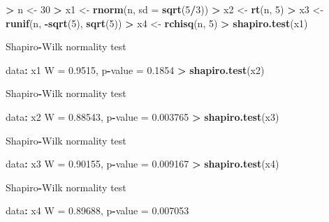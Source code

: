 \documentclass[
  a4paper,
  oneside]{scrbook}
\newenvironment{Shaded}{\begin{snugshade}}{\end{snugshade}}
\newcommand{\AttributeTok}[1]{\textcolor[rgb]{0.13,0.29,0.53}{#1}}
\newcommand{\DecValTok}[1]{\textcolor[rgb]{0.00,0.00,0.81}{#1}}
\newcommand{\FloatTok}[1]{\textcolor[rgb]{0.00,0.00,0.81}{#1}}
\newcommand{\FunctionTok}[1]{\textcolor[rgb]{0.13,0.29,0.53}{\textbf{#1}}}
\newcommand{\NormalTok}[1]{#1}
\newcommand{\OtherTok}[1]{\textcolor[rgb]{0.56,0.35,0.01}{#1}}
\newcommand{\SpecialCharTok}[1]{\textcolor[rgb]{0.81,0.36,0.00}{\textbf{#1}}}
\theoremstyle{definition}
\theoremstyle{definition}
\theoremstyle{definition}
\theoremstyle{definition}
\theoremstyle{remark}
\begin{document}
\footnotesize

\begin{Shaded}
\begin{Highlighting}[]
\SpecialCharTok{\textgreater{}}\NormalTok{ n }\OtherTok{\textless{}{-}} \DecValTok{30}
\SpecialCharTok{\textgreater{}}\NormalTok{ x1 }\OtherTok{\textless{}{-}} \FunctionTok{rnorm}\NormalTok{(n, }\AttributeTok{sd =} \FunctionTok{sqrt}\NormalTok{(}\DecValTok{5}\SpecialCharTok{/}\DecValTok{3}\NormalTok{))}
\SpecialCharTok{\textgreater{}}\NormalTok{ x2 }\OtherTok{\textless{}{-}} \FunctionTok{rt}\NormalTok{(n, }\DecValTok{5}\NormalTok{)}
\SpecialCharTok{\textgreater{}}\NormalTok{ x3 }\OtherTok{\textless{}{-}} \FunctionTok{runif}\NormalTok{(n, }\SpecialCharTok{{-}}\FunctionTok{sqrt}\NormalTok{(}\DecValTok{5}\NormalTok{), }\FunctionTok{sqrt}\NormalTok{(}\DecValTok{5}\NormalTok{))}
\SpecialCharTok{\textgreater{}}\NormalTok{ x4 }\OtherTok{\textless{}{-}} \FunctionTok{rchisq}\NormalTok{(n, }\DecValTok{5}\NormalTok{)}
\SpecialCharTok{\textgreater{}} \FunctionTok{shapiro.test}\NormalTok{(x1)}

\NormalTok{    Shapiro}\SpecialCharTok{{-}}\NormalTok{Wilk normality test}

\NormalTok{data}\SpecialCharTok{:}\NormalTok{  x1}
\NormalTok{W }\OtherTok{=} \FloatTok{0.9515}\NormalTok{, p}\SpecialCharTok{{-}}\NormalTok{value }\OtherTok{=} \FloatTok{0.1854}
\SpecialCharTok{\textgreater{}} \FunctionTok{shapiro.test}\NormalTok{(x2)}

\NormalTok{    Shapiro}\SpecialCharTok{{-}}\NormalTok{Wilk normality test}

\NormalTok{data}\SpecialCharTok{:}\NormalTok{  x2}
\NormalTok{W }\OtherTok{=} \FloatTok{0.88543}\NormalTok{, p}\SpecialCharTok{{-}}\NormalTok{value }\OtherTok{=} \FloatTok{0.003765}
\SpecialCharTok{\textgreater{}} \FunctionTok{shapiro.test}\NormalTok{(x3)}

\NormalTok{    Shapiro}\SpecialCharTok{{-}}\NormalTok{Wilk normality test}

\NormalTok{data}\SpecialCharTok{:}\NormalTok{  x3}
\NormalTok{W }\OtherTok{=} \FloatTok{0.90155}\NormalTok{, p}\SpecialCharTok{{-}}\NormalTok{value }\OtherTok{=} \FloatTok{0.009167}
\SpecialCharTok{\textgreater{}} \FunctionTok{shapiro.test}\NormalTok{(x4)}

\NormalTok{    Shapiro}\SpecialCharTok{{-}}\NormalTok{Wilk normality test}

\NormalTok{data}\SpecialCharTok{:}\NormalTok{  x4}
\NormalTok{W }\OtherTok{=} \FloatTok{0.89688}\NormalTok{, p}\SpecialCharTok{{-}}\NormalTok{value }\OtherTok{=} \FloatTok{0.007053}
\end{Highlighting}
\end{Shaded}
\end{document}
